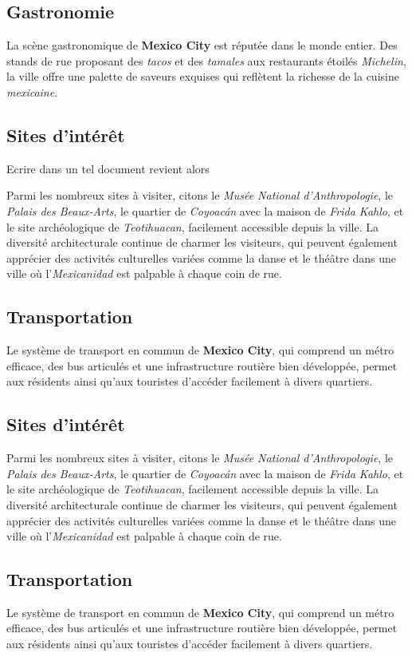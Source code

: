 \documentclass[12pt, a4paper]{article}
\begin{document}
\subsection*{\textbf{Gastronomie}}

La scène gastronomique de \textbf{Mexico City} est réputée dans le monde entier. Des stands de rue proposant des \textit{tacos} et des \textit{tamales} aux restaurants étoilés \textit{Michelin}, la ville offre une palette de saveurs exquises qui reflètent la richesse de la cuisine \textit{mexicaine}.

\subsection*{\textbf{Sites d'intérêt}}

Ecrire dans un tel document revient alors

Parmi les nombreux sites à visiter, citons le \textit{Musée National d'Anthropologie}, le \textit{Palais des Beaux-Arts}, le quartier de \textit{Coyoacán} avec la maison de \textit{Frida Kahlo}, et le site archéologique de \textit{Teotihuacan}, facilement accessible depuis la ville.
La diversité architecturale continue de charmer les visiteurs, qui peuvent également apprécier des activités culturelles variées comme la danse et le théâtre dans une ville où l'\textit{Mexicanidad} est palpable à chaque coin de rue. \subsection*{\textbf{Transportation}} Le système de transport en commun de \textbf{Mexico City}, qui comprend un métro efficace, des bus articulés et une infrastructure routière bien développée, permet aux résidents ainsi qu'aux touristes d'accéder facilement à divers quartiers.

\subsection*{\textbf{Sites d'intérêt}}

Parmi les nombreux sites à visiter, citons le \textit{Musée National d'Anthropologie}, le \textit{Palais des Beaux-Arts}, le quartier de \textit{Coyoacán} avec la maison de \textit{Frida Kahlo}, et le site archéologique de \textit{Teotihuacan}, facilement accessible depuis la ville.
La diversité architecturale continue de charmer les visiteurs, qui peuvent également apprécier des activités culturelles variées comme la danse et le théâtre dans une ville où l'\textit{Mexicanidad} est palpable à chaque coin de rue. \subsection*{\textbf{Transportation}} Le système de transport en commun de \textbf{Mexico City}, qui comprend un métro efficace, des bus articulés et une infrastructure routière bien développée, permet aux résidents ainsi qu'aux touristes d'accéder facilement à divers quartiers.
\end{document}
